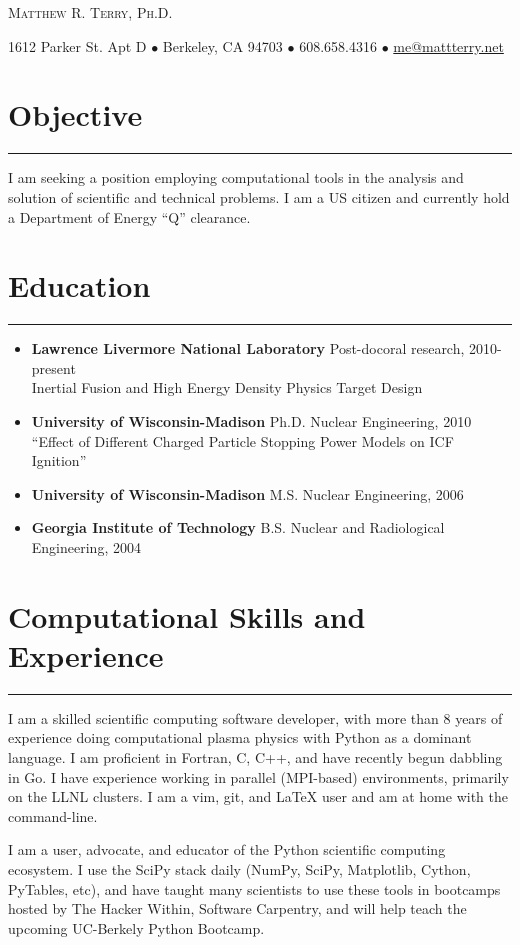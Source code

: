 \documentclass[letterpaper,11pt]{article}
\def\name{Matthew R. Terry, Ph.D.}
\newcommand{\sectionline}{\vspace{-0.05in}\hrule\vspace{0.05in}}
\begin{document}
\begin{center}
	{\huge\scshape \name}

	1612 Parker St. Apt D $\bullet$
	Berkeley, CA 94703 $\bullet$
	608.658.4316 $\bullet$
	\href{mailto:me@mattterry.net}{me@mattterry.net}
\end{center}

\section*{Objective}
\sectionline
I am seeking a position employing computational tools in the analysis and
solution of scientific and technical problems.  I am a US citizen and currently
hold a Department of Energy ``Q'' clearance.

\section*{Education}
\sectionline
\begin{itemize}
	\item
		\textbf{Lawrence Livermore National Laboratory} Post-docoral research, 2010-present \\
		Inertial Fusion and High Energy Density Physics Target Design
	\item 
		\textbf{University of Wisconsin-Madison} Ph.D. Nuclear Engineering, 2010 \\
		``Effect of Different Charged Particle Stopping Power Models on ICF Ignition''
	\item 
		\textbf{University of Wisconsin-Madison} M.S. Nuclear Engineering, 2006
	\item 
		\textbf{Georgia Institute of Technology} B.S. Nuclear and Radiological Engineering, 2004
\end{itemize}


\section*{Computational Skills and Experience}
\sectionline

I am a skilled scientific computing software developer, with more than 8
years of experience doing computational plasma physics with Python as a
dominant language.  I am proficient in Fortran, C, C++, and have recently begun
dabbling in Go.  I have experience working in parallel (MPI-based)
environments, primarily on the LLNL clusters.  I am a vim, git, and \LaTeX
user and am at home with the command-line.

I am a user, advocate, and educator of the Python scientific computing
ecosystem.  I use the SciPy stack daily (NumPy, SciPy, Matplotlib, Cython,
PyTables, etc), and have taught many scientists to use these tools in bootcamps
hosted by The Hacker Within, Software Carpentry, and will help teach the
upcoming UC-Berkely Python Bootcamp.
\end{document}
